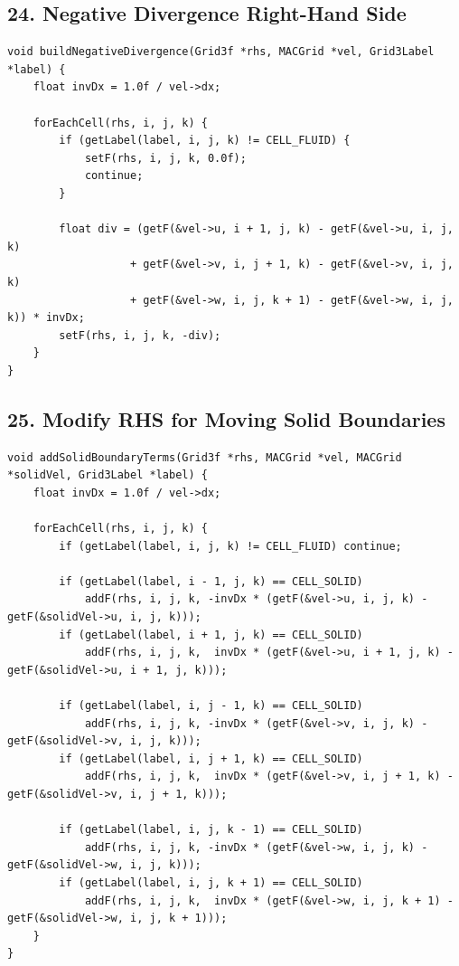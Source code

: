 \documentclass[10pt,letterpaper]{article}
\begin{document}
\subsection*{24. Negative Divergence Right-Hand Side}

\begin{verbatim}
void buildNegativeDivergence(Grid3f *rhs, MACGrid *vel, Grid3Label *label) {
    float invDx = 1.0f / vel->dx;

    forEachCell(rhs, i, j, k) {
        if (getLabel(label, i, j, k) != CELL_FLUID) {
            setF(rhs, i, j, k, 0.0f);
            continue;
        }

        float div = (getF(&vel->u, i + 1, j, k) - getF(&vel->u, i, j, k)
                   + getF(&vel->v, i, j + 1, k) - getF(&vel->v, i, j, k)
                   + getF(&vel->w, i, j, k + 1) - getF(&vel->w, i, j, k)) * invDx;
        setF(rhs, i, j, k, -div);
    }
}
\end{verbatim}

\subsection*{25. Modify RHS for Moving Solid Boundaries}

\begin{verbatim}
void addSolidBoundaryTerms(Grid3f *rhs, MACGrid *vel, MACGrid *solidVel, Grid3Label *label) {
    float invDx = 1.0f / vel->dx;

    forEachCell(rhs, i, j, k) {
        if (getLabel(label, i, j, k) != CELL_FLUID) continue;

        if (getLabel(label, i - 1, j, k) == CELL_SOLID)
            addF(rhs, i, j, k, -invDx * (getF(&vel->u, i, j, k) - getF(&solidVel->u, i, j, k)));
        if (getLabel(label, i + 1, j, k) == CELL_SOLID)
            addF(rhs, i, j, k,  invDx * (getF(&vel->u, i + 1, j, k) - getF(&solidVel->u, i + 1, j, k)));

        if (getLabel(label, i, j - 1, k) == CELL_SOLID)
            addF(rhs, i, j, k, -invDx * (getF(&vel->v, i, j, k) - getF(&solidVel->v, i, j, k)));
        if (getLabel(label, i, j + 1, k) == CELL_SOLID)
            addF(rhs, i, j, k,  invDx * (getF(&vel->v, i, j + 1, k) - getF(&solidVel->v, i, j + 1, k)));

        if (getLabel(label, i, j, k - 1) == CELL_SOLID)
            addF(rhs, i, j, k, -invDx * (getF(&vel->w, i, j, k) - getF(&solidVel->w, i, j, k)));
        if (getLabel(label, i, j, k + 1) == CELL_SOLID)
            addF(rhs, i, j, k,  invDx * (getF(&vel->w, i, j, k + 1) - getF(&solidVel->w, i, j, k + 1)));
    }
}
\end{verbatim}
\end{document}
